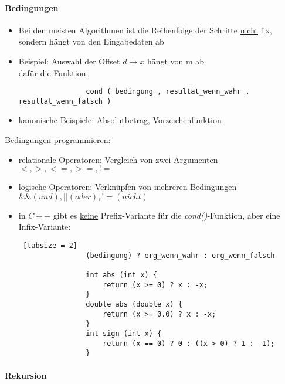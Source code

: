 \documentclass{article}
\begin{document}
	 	\paragraph{Bedingungen}
	 	\begin{itemize}
	 		\item Bei den meisten Algorithmen ist die Reihenfolge der Schritte \underline{nicht} fix, sondern hängt von den Eingabedaten ab
	 		\item Beispiel: Auswahl der Offset $d \rightarrow x$ hängt von m ab \\
	 		dafür die Funktion:
	 		\begin{lstlisting}
	 			cond ( bedingung , resultat_wenn_wahr , resultat_wenn_falsch )
	 		\end{lstlisting}
	 		\item kanonische Beispiele: Absolutbetrag, Vorzeichenfunktion
	 	\end{itemize}
	 	
	 	Bedingungen programmieren:
	 	\begin{itemize}
	 		\item relationale Operatoren: Vergleich von zwei Argumenten \\ $< , > , <= , >= , !=$
	 		\item logische Operatoren: Verknüpfen von mehreren Bedingungen \\
		 		$ \&\& (und), || (oder), != (nicht)$
		 	\item in $C++$ gibt es \underline{keine} Prefix-Variante für die \textit{cond()}-Funktion, aber eine Infix-Variante:
		 	\begin{lstlisting} [tabsize = 2]
				(bedingung) ? erg_wenn_wahr : erg_wenn_falsch
				
				int abs (int x) {
					return (x >= 0) ? x : -x;
				}
				double abs (double x) {
					return (x >= 0.0) ? x : -x;
				}
				int sign (int x) {
					return (x == 0) ? 0 : ((x > 0) ? 1 : -1);
				}
		 	\end{lstlisting}
	 	\end{itemize}
	 	
	 	\paragraph{Rekursion}
	 	
\end{document}
